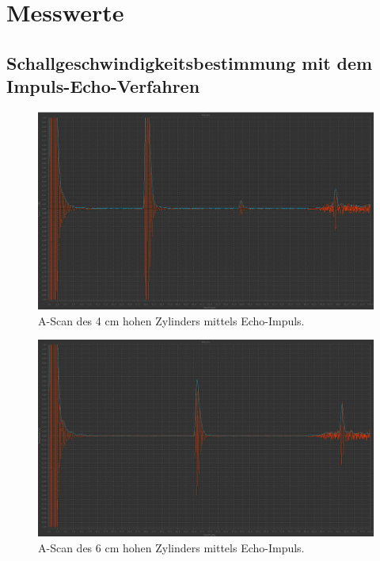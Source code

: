 \newpage

\section{Messwerte}
\label{sec:Messwerte}

\subsection{Schallgeschwindigkeitsbestimmung mit dem Impuls-Echo-Verfahren}

    \begin{figure}
        \centering
        \includegraphics[width=15cm]{messwerte/Impuls-Echo/4_ImEc.png}
        \caption{A-Scan des 4 cm hohen Zylinders mittels Echo-Impuls.}
    \end{figure}

    \begin{figure}
        \centering
        \includegraphics[width=15cm]{messwerte/Impuls-Echo/6_ImEc.png}
        \caption{A-Scan des 6 cm hohen Zylinders mittels Echo-Impuls.}
    \end{figure}

